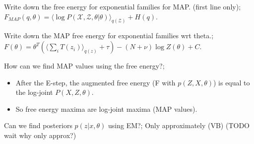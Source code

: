 \documentclass{article}
\begin{document}
Write down the free energy for exponential families for MAP. (first line only);  $F_{MAP}(q,\theta) = \langle \log P(\mathcal{X, Z, \theta}|\theta)\rangle_{q(\mathcal{Z})}+H(q)$.

Write down the MAP free energy for exponential families wrt theta.;  $F(\theta) = \theta^T(\langle \sum_i T(z_i) \rangle_{q(z)} + \tau)- (N+\nu) \log Z(\theta) + C$.

How can we find MAP values using the free energy?; \begin{itemize}
    \item After the E-step, the augmented free energy (F with $p(Z, X, \theta)$) is equal to the log-joint $P(X, Z, \theta)$.
    \item So free energy maxima are log-joint maxima (MAP values).
\end{itemize}

Can we find posteriors $p(z|x, \theta)$ using EM?; Only approximately (VB) (TODO wait why only approx?)
\end{document}
